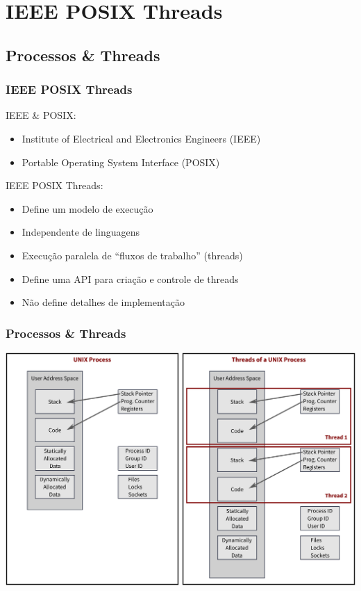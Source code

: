 \documentclass[10pt, compress]{beamer}
\begin{document}
\section{IEEE POSIX Threads}

\subsection{Processos \& Threads}

\begin{frame}
    \frametitle{IEEE POSIX Threads}

    \alert{IEEE} \& \alert{POSIX}:
    \begin{itemize}
        \item Institute of Electrical and Electronics Engineers (\alert{IEEE})
        \item Portable Operating System Interface (\alert{POSIX})
    \end{itemize}

    \pause

    \alert{IEEE POSIX Threads}:
    \begin{itemize}
        \item Define um \alert{modelo de execução}
        \item \alert{Independente} de linguagens
        \item Execução paralela de ``\alert{fluxos de trabalho}'' (\alert{threads})
        \item Define uma API para \alert{criação e controle} de threads
        \item \alert{Não define} detalhes de implementação
    \end{itemize}
\end{frame}

\begin{frame}
    \frametitle{Processos \& Threads}
    \begin{center}
        \includegraphics[width=\textwidth]{process-and-thread}
    \end{center}
\end{frame}
\end{document}
